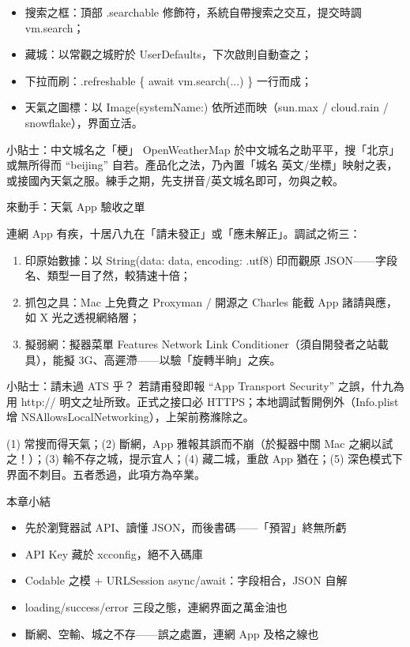 \begin{itemize}
  \item 搜索之框：頂部 .searchable 修飾符，系統自帶搜索之交互，提交時調 vm.search；
  \item 藏城：以常觀之城貯於 UserDefaults，下次啟則自動查之；
  \item 下拉而刷：.refreshable \{ await vm.search(...) \} 一行而成；
  \item 天氣之圖標：以 Image(systemName:) 依所述而映（sun.max / cloud.rain / snowflake），界面立活。
\end{itemize}

\begin{tcbinfo}{小貼士：中文城名之「梗」}
OpenWeatherMap 於中文城名之助平平，搜「北京」或無所得而 “beijing” 自若。產品化之法，乃內置「城名 英文/坐標」映射之表，或接國內天氣之服。練手之期，先支拼音/英文城名即可，勿與之較。

\end{tcbinfo}

\begin{tcbpractice}{來動手：天氣 App 驗收之單}

連網 App 有疾，十居八九在「請未發正」或「應未解正」。調試之術三：

\begin{enumerate}
  \item 印原始數據：以 String(data: data, encoding: .utf8) 印而觀原 JSON——字段名、類型一目了然，較猜速十倍；
  \item 抓包之具：Mac 上免費之 Proxyman / 開源之 Charles 能截 App 諸請與應，如 X 光之透視網絡層；
  \item 擬弱網：擬器菜單 Features Network Link Conditioner（須自開發者之站載具），能擬 3G、高遲滯——以驗「旋轉半晌」之疾。
\end{enumerate}

\begin{tcbinfo}{小貼士：請未過 ATS 乎？}
若請甫發即報 “App Transport Security” 之誤，什九為用 http:// 明文之址所致。正式之接口必 HTTPS；本地調試暫開例外（Info.plist 增 NSAllowsLocalNetworking），上架前務滌除之。

\end{tcbinfo}

(1) 常搜而得天氣；(2) 斷網，App 雅報其誤而不崩（於擬器中關 Mac 之網以試之！）；(3) 輸不存之城，提示宜人；(4) 藏二城，重啟 App 猶在；(5) 深色模式下界面不刺目。五者悉過，此項方為卒業。

\end{tcbpractice}

\begin{tcbsummary}{本章小結}
\begin{itemize}
  \item 先於瀏覽器試 API、讀懂 JSON，而後書碼——「預習」終無所虧
  \item API Key 藏於 xcconfig，絕不入碼庫
  \item Codable 之模 + URLSession async/await：字段相合，JSON 自解
  \item loading/success/error 三段之態，連網界面之萬金油也
  \item 斷網、空輸、城之不存——誤之處置，連網 App 及格之線也
\end{itemize}

\end{tcbsummary}
